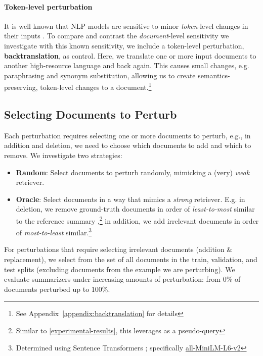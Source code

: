 \documentclass[11pt]{article}
\begin{document}
\paragraph{Token-level perturbation}

It is well known that NLP models are sensitive to minor \textit{token}-level changes in their inputs \citep{prabhakaran-etal-2019-perturbation, niu-etal-2020-evaluating, ribeiro-etal-2020-beyond, moradi-samwald-2021-evaluating}. To compare and contrast the \textit{document}-level sensitivity we investigate with this known sensitivity, we include a token-level perturbation, \textbf{backtranslation}, as control. Here, we translate one or more input documents to another high-resource language and back again. This causes small changes, e.g. paraphrasing and synonym substitution, allowing us to create semantics-preserving, token-level changes to a document.\footnote{See Appendix~\ref{appendix:backtranslation} for details}

\subsection{Selecting Documents to Perturb}
\label{experimental-setup:document-selection}

Each perturbation requires selecting one or more documents to perturb, e.g., in addition and deletion, we need to choose which documents to add and which to remove. We investigate two strategies:

\begin{itemize}[itemsep=0.2pt, topsep=3pt, leftmargin=10pt]
    \item \textbf{Random}: Select documents to perturb randomly, mimicking a (very) \textit{weak}
    retriever.
    \item{\textbf{Oracle}}: Select documents in a way that mimics a \textit{strong} retriever. E.g. in deletion, we remove ground-truth documents in order of \textit{least-to-most} similar to the reference summary ,\footnote{Similar to \textsection \ref{experimental-results}, this leverages  as a pseudo-query} in addition, we add irrelevant documents in order of \textit{most-to-least} similar.\footnote{Determined using Sentence Transformers \citep{sbert}; specifically \href{https://huggingface.co/sentence-transformers/all-MiniLM-L6-v2}{all-MiniLM-L6-v2}}
\end{itemize}


\noindent For perturbations that require selecting irrelevant documents (addition \& replacement), we select from the set of all documents in the train, validation, and test splits (excluding documents from the example we are perturbing). We evaluate summarizers under increasing amounts of perturbation: from 0\% of documents perturbed up to 100\%.
\end{document}
